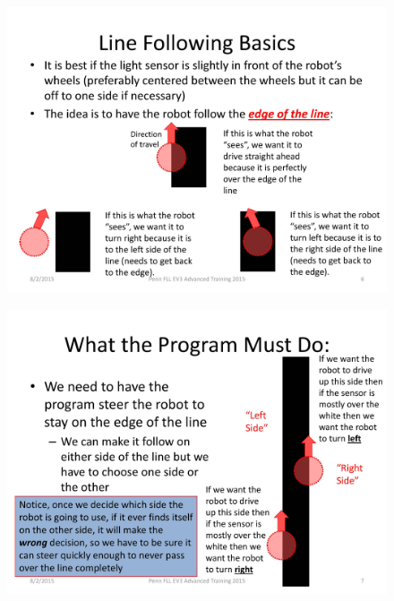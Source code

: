 \documentclass[11pt]{beamer}
\begin{document}
\begin{frame}
\begin{figure}
\includegraphics[scale=0.4]{ev3advanced2015/file-page6}
\end{figure}
\end{frame}

\begin{frame}
\begin{figure}
\includegraphics[scale=0.4]{ev3advanced2015/file-page7}
\end{figure}
\end{frame}
\end{document}
